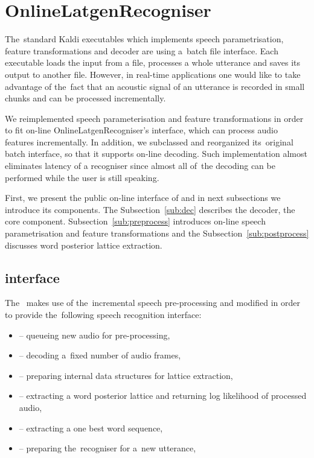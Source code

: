 \section{OnlineLatgenRecogniser}
\label{sec:rec}

The~standard Kaldi executables which implements speech parametrisation, feature transformations and decoder are using a~batch file interface.
Each executable loads the input from a file, processes a whole utterance and saves its output to another file.
However, in real-time applications one would like to take advantage of the~fact that an acoustic signal of an utterance is recorded in small chunks and can be processed incrementally.

We reimplemented speech parameterisation and feature transformations in order to fit on-line OnlineLatgenRecogniser's interface, which can process audio features incrementally.
In addition, we subclassed  and reorganized its~original batch interface, so that it supports on-line decoding.
Such implementation almost eliminates latency of a recogniser since almost all of~the decoding can be performed while the user is still speaking.

First, we present the public on-line interface of  and in next subsections we introduce its components.
The Subsection~\ref{sub:dec} describes the decoder, the core component.
Subsection~\ref{sub:preprocess} introduces on-line speech parametrisation and feature transformations and the Subsection~\ref{sub:postprocess} discusses word posterior lattice extraction.

\subsection{ interface}
\label{sub:verb_c_}
The~ makes use of the~incremental speech pre-processing and modified  in order to provide the~following speech recognition interface:
\begin{itemize}
\item {} -- queueing new audio for pre-processing,
\item {} -- decoding a~fixed number of audio frames,
\item {} -- preparing internal data structures for lattice extraction,
\item {} -- extracting a word posterior lattice and returning log likelihood of processed audio,
\item {} -- extracting a one best word sequence,
\item {} -- preparing the~recogniser for a~new utterance,
\end{itemize}

